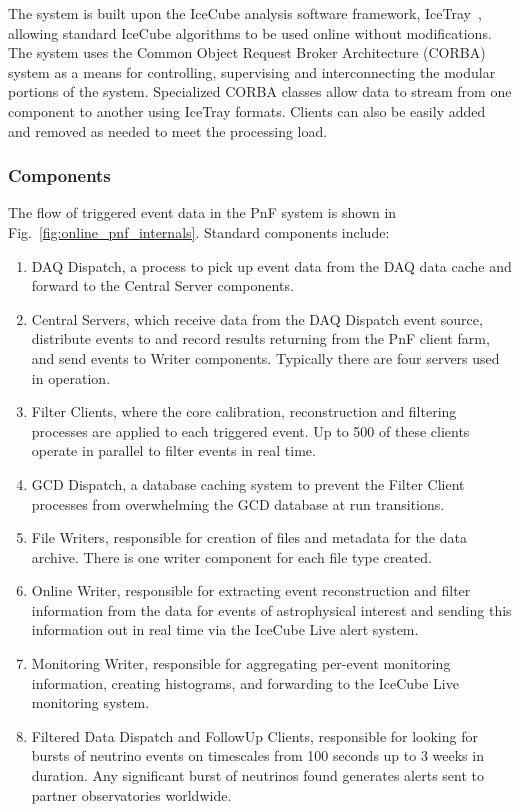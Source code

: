 The system is built upon the IceCube analysis software framework,
IceTray~\cite{DeYoung:2005zz}, allowing standard IceCube algorithms to be
used online without modifications.
The system uses the Common Object Request Broker Architecture
(CORBA) system as a means for controlling, supervising and interconnecting
the modular portions of the system.  Specialized CORBA classes allow
data to stream from one component to another using IceTray formats.
Clients can also be easily added and removed as needed to meet the
processing load.

\subsubsection{Components}

The flow of triggered event data in the PnF
system is shown in Fig.~\ref{fig:online_pnf_internals}.  Standard
components include: 
\begin{enumerate}
\item DAQ Dispatch, a process to pick up event data from the DAQ data cache
  and forward to the Central Server components. 
\item Central Servers, which
  receive data from the 
  DAQ Dispatch event source, distribute events to and record results
  returning from the PnF client farm, and send events to Writer components.
  Typically there are four servers used in operation.
\item Filter Clients, where the core calibration, reconstruction and
  filtering processes are applied to each triggered event.  Up to 500 of
  these clients operate in parallel to filter 
  events in real time.
\item GCD Dispatch, a database caching system to prevent the
  Filter Client processes from overwhelming the GCD database at run transitions.
\item File Writers, responsible for creation of files and metadata for
  the data archive.  There is one writer component for each file type created.
\item Online Writer, responsible for extracting event reconstruction and
  filter information from the data for events of astrophysical interest and
  sending this information out in real time via the IceCube Live alert
  system.
\item Monitoring Writer, responsible for aggregating per-event monitoring
  information, creating histograms, and forwarding to the IceCube Live
  monitoring system.
\item Filtered Data Dispatch and FollowUp Clients, responsible for
  looking for bursts of neutrino events on timescales from 100 seconds up
  to 3 weeks in duration.  Any significant burst of neutrinos found generates alerts
  sent to partner observatories worldwide.
\end{enumerate}

